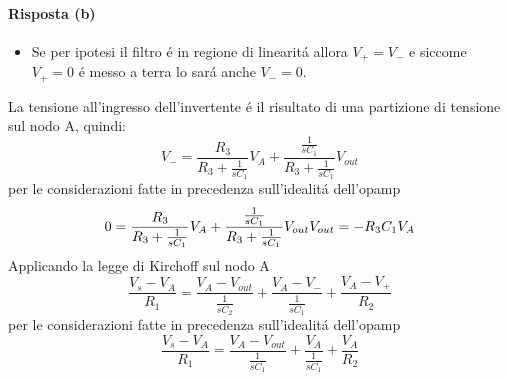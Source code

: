\paragraph{Risposta (b)}
\begin{itemize}
\item
  Se per ipotesi il filtro \'e in regione di linearit\'a allora $V_+ = V_-$ e siccome
  $V_+ = 0$ \'e messo a terra lo sar\'a anche $V_- = 0$.
\end{itemize}
La tensione all'ingresso dell'invertente \'e il risultato di una partizione di tensione
sul nodo A, quindi:
\begin{equation*}
  V_- = \frac{R_3}{R_3 + \frac{1}{sC_1}}V_A + \frac{\frac{1}{sC_1}}{R_3 + \frac{1}{sC_1}}V_{out}
\end{equation*}
per le considerazioni fatte in precedenza sull'idealit\'a dell'opamp
\begin{equation*}
  0 = \frac{R_3}{R_3 + \frac{1}{sC_1}}V_A + \frac{\frac{1}{sC_1}}{R_3 + \frac{1}{sC_1}}V_{out} \\
  V_{out} = -R_3C_1V_A
\end{equation*}
Applicando la legge di Kirchoff sul nodo A
\begin{equation*}
  \frac{V_s - V_A}{R_1} = \frac{V_A - V_{out}}{\frac{1}{sC_2}} + \frac{V_A - V_-}{\frac{1}{sC_1}} + \frac{V_A - V_+}{R_2}
\end{equation*}
per le considerazioni fatte in precedenza sull'idealit\'a dell'opamp
\begin{equation*}
  \frac{V_s - V_A}{R_1} = \frac{V_A - V_{out}}{\frac{1}{sC_1}} + \frac{V_A}{\frac{1}{sC_1}} + \frac{V_A}{R_2}
\end{equation*}
